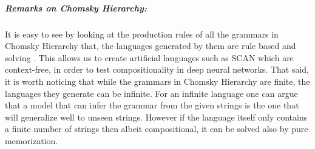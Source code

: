 \subparagraph{Remarks on Chomsky Hierarchy:}It is easy to see by looking at the production rules of all the grammars in Chomsky Hierarchy that, the languages generated by them are rule based and solving . This allows us to create artificial languages such as SCAN \citep{Lake2017} which are context-free, in order to test compositionality in deep neural networks. That said, it is worth noticing that while the grammars in Chomsky Hierarchy are finite, the languages they generate can be infinite. For an infinite language one can argue that a model that can infer the grammar from the given strings is the one that will generalize well to unseen strings. However if the language itself only contains a finite number of strings then albeit compositional, it can be solved also by pure memorization.

